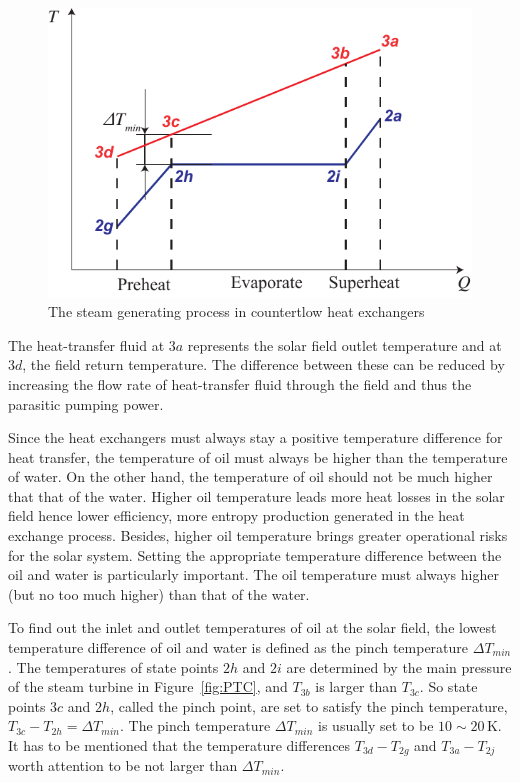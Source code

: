 \noindent \begin{figure}[htbp]
\begin{center}
	\includegraphics[width = 0.7\columnwidth]{fig/DeltaTmin}
	\caption{The steam generating process in countertlow heat exchangers}
	\label{fig:DeltaTmin}
\end{center}
\end{figure}

The heat-transfer fluid at $3a$ represents the solar field outlet temperature and at $3d$, the field return temperature. The difference between these can be reduced by increasing the flow rate of heat-transfer fluid through the field and thus the parasitic pumping power.

Since the heat exchangers must always stay a positive temperature difference for heat transfer, the temperature of oil must always be higher than the temperature of water. On the other hand, the temperature of oil should not be much higher that that of the water. Higher oil temperature leads more heat losses in the solar field hence lower efficiency, more entropy production generated in the heat exchange process. Besides, higher oil temperature brings greater operational risks for the solar system. Setting the appropriate temperature difference between the oil and water is particularly important. The oil temperature must always higher (but no too much higher) than that of the water.

To find out the inlet and outlet temperatures of oil at the solar field, the lowest temperature difference of oil and water is defined as the pinch temperature $\Delta T_{min}$. The temperatures of state points $2h$ and $2i$ are determined by the main pressure of the steam turbine in Figure~\ref{fig:PTC}, and $T_{3b}$ is larger than $T_{3c}$. So state points $3c$ and $2h$, called the pinch point, are set to satisfy the pinch temperature, $T_{3c} - T_{2h} = \Delta T_{min}$. The pinch temperature $\Delta T_{min}$ is usually set to be $10\sim 20\,\mathrm{K}$.
It has to be mentioned that the temperature differences $T_{3d} - T_{2g}$ and $T_{3a} - T_{2j}$ worth attention to be not larger than $\Delta T_{min}$.


